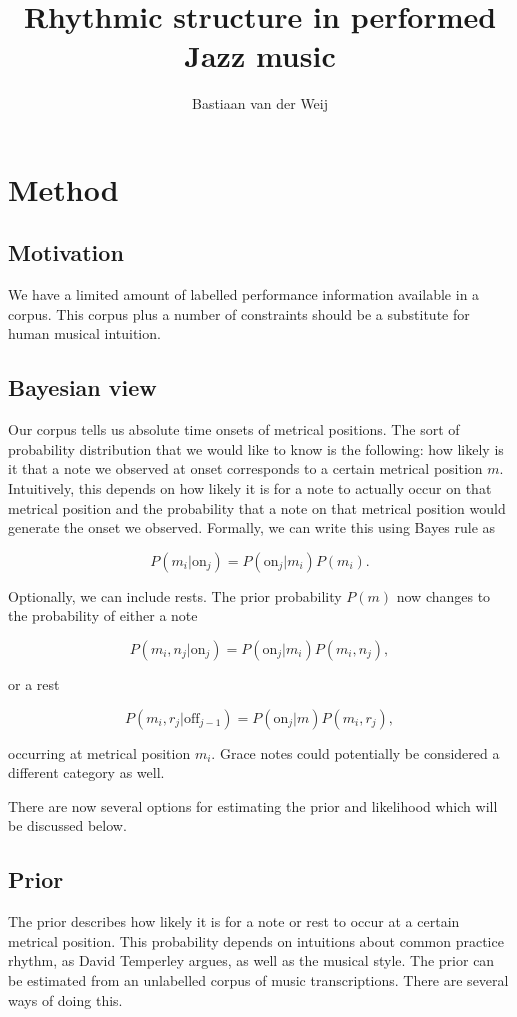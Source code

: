 \documentclass[a4paper,10pt]{article}
\title{Rhythmic structure in performed Jazz music}
\author{Bastiaan van der Weij}
\begin{document}
\section{Method}
\label{sec:method}


\subsection{Motivation}

We have a limited amount of labelled performance information available in a corpus. This corpus plus a number of constraints should be a substitute for human musical intuition.

\subsection{Bayesian view}

Our corpus tells us absolute time onsets of metrical positions. The sort of probability distribution that we would like to know is the following: how likely is it that a note we observed at onset corresponds to a certain metrical position $m$. Intuitively, this depends on how likely it is for a note to actually occur on that metrical position and the probability that a note on that metrical position would generate the onset we observed. Formally, we can write this using Bayes rule as

\[P(m_i|\textrm{on}_j) = P(\textrm{on}_j|m_i)P(m_i).\]

Optionally, we can include rests. The prior probability $P(m)$ now changes to the probability of either a note 

\[P(m_i,n_j|\textrm{on}_j) = P(\textrm{on}_j|m_i)P(m_i,n_j),\]

or a rest

\[P(m_i,r_j|\textrm{off}_{j-1}) = P(\textrm{on}_j|m)P(m_i,r_j),\]

occurring at metrical position $m_i$. Grace notes could potentially be considered a different category as well.

There are now several options for estimating the prior and likelihood which will be discussed below.

\subsection{Prior}
The prior describes how likely it is for a note or rest to occur at a certain metrical position. This probability depends on intuitions about common practice rhythm, as David Temperley argues, as well as the musical style. The prior can be estimated from an unlabelled corpus of music transcriptions. There are several ways of doing this.
\end{document}

